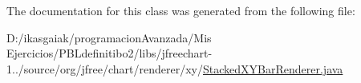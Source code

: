 The documentation for this class was generated from the following file\+:\begin{DoxyCompactItemize}
\item 
D\+:/ikasgaiak/programacion\+Avanzada/\+Mis Ejercicios/\+P\+B\+Ldefinitibo2/libs/jfreechart-\/1../source/org/jfree/chart/renderer/xy/\mbox{\hyperlink{_stacked_x_y_bar_renderer_8java}{Stacked\+X\+Y\+Bar\+Renderer.\+java}}\end{DoxyCompactItemize}
